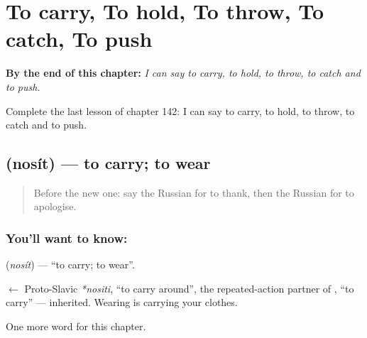 
\chapter{To carry, To hold, To throw, To catch, To push}
\label{ch:ru-to-carry-to-hold-to-throw-to-catch-to-push}

\begin{chapteropening}
\textbf{By the end of this chapter:} \emph{I can say to carry, to hold, to throw, to catch and to push.}

Complete the last lesson of chapter 142: I can say to carry, to hold, to throw, to catch and to push.
\end{chapteropening}

\section[\texorpdfstring{\ru{носить} (nosít)}{носить (nosít)}]{ (nosít) — to carry; to wear}

\label{lesson:RU-C142-nosit}



\begin{quote}
Before the new one: say the Russian for to thank, then the Russian for to apologise.
\end{quote}

\subsection*{You'll want to know: }
\textbf{} (\emph{nosít}) — \textquotedblleft{}to carry; to wear\textquotedblright{}.

\begin{cousinweb}
\textbf{} $\leftarrow$ Proto-Slavic \emph{*nositi}, \textquotedblleft{}to carry around\textquotedblright{}, the repeated-action partner of \emph{}, \textquotedblleft{}to carry\textquotedblright{} — inherited. Wearing is carrying your clothes.
\end{cousinweb}

\begin{grammarlens}[title={What you've built}]
One more word for this chapter.
\end{grammarlens}

